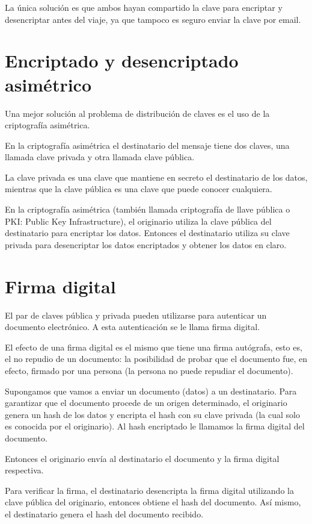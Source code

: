 \documentclass[11pt,a4paper,oneside]{book}
\begin{document}
La única solución es que ambos hayan compartido la clave para encriptar y desencriptar antes del viaje, ya que tampoco es seguro enviar la clave por email.

\section{Encriptado y desencriptado asimétrico}

Una mejor solución al problema de distribución de claves es el uso de la criptografía asimétrica.

En la criptografía asimétrica el destinatario del mensaje tiene dos claves, una llamada clave privada y otra llamada clave pública.

La clave privada es una clave que mantiene en secreto el destinatario de los datos, mientras que la clave pública es una clave que puede conocer cualquiera.

En la criptografía asimétrica (también llamada criptografía de llave pública o PKI: Public Key Infrastructure), el originario utiliza la clave pública del destinatario para encriptar los datos. Entonces el destinatario utiliza su clave privada para desencriptar los datos encriptados y obtener los datos en claro.

\section{Firma digital}

El par de claves pública y privada pueden utilizarse para autenticar un documento electrónico. A esta autenticación se le llama firma digital.

El efecto de una firma digital es el mismo que tiene una firma autógrafa, esto es, el no repudio de un documento: la posibilidad de probar que el documento fue, en efecto, firmado por una persona (la persona no puede repudiar el documento).

Supongamos que vamos a enviar un documento (datos) a un destinatario. Para garantizar que el documento procede de un origen determinado, el originario genera un hash de los datos y encripta el hash con su clave privada (la cual solo es conocida por el originario). Al hash encriptado le llamamos la firma digital del documento.

Entonces el originario envía al destinatario el documento y la firma digital respectiva.

Para verificar la firma, el destinatario desencripta la firma digital utilizando la clave pública del originario, entonces obtiene el hash del documento. Así mismo, el destinatario genera el hash del documento recibido.
\end{document}
